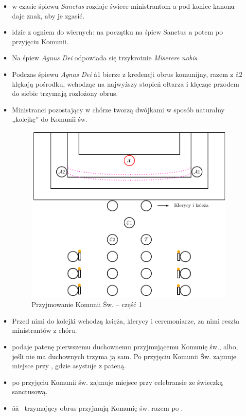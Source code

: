 \begin{itemize}
      \item {} w czasie śpiewu \textit{Sanctus} rozdaje świece ministrantom a
            pod koniec kanonu daje znak, aby je zgasić.
      \item {} idzie z ogniem do wiernych: na początku na śpiew Sanctus a potem
            po przyjęciu Komunii.
      \item Na śpiew \textit{Agnus Dei} odpowiada się trzykrotnie
            \textit{Miserere nobis}.
      \item Podczas śpiewu \textit{Agnus Dei} \aa1 bierze z kredencji obrus
            komunijny, razem z \aa2 klękają pośrodku, wchodząc na najwyższy
            stopień ołtarza i klęcząc przodem do siebie trzymają rozłożony obrus.
      \item Ministranci pozostający w chórze tworzą dwójkami w sposób naturalny
            „kolejkę” do Komunii św.
            \begin{figure}[h!]
                  \centering
                  \includegraphics[width=0.5\linewidth]{Figures/Czwartek/Komunia1.pdf}
                  \caption{Przyjmowanie Komunii Św. -- część 1}
            \end{figure}
      \item Przed nimi do kolejki wchodzą księża, klerycy i ceremoniarze, za nimi
            reszta ministrantów z chóru.
      \item {} podaje patenę pierwszemu duchownemu przyjmującemu Komunię św.,
            albo, jeśli nie ma duchownych trzyma ją sam. Po przyjęciu Komunii Św.
            zajmuje miejsce przy \ii, gdzie asystuje z pateną.
      \item {} po przyjęciu Komunii św. zajmuje miejsce przy celebransie ze
            świeczką sanctusową.
      \item \aa\aa~ trzymający obrus przyjmują Komunię św. razem po \cc.
            \begin{figure}[h!]

\end{figure}
\end{itemize}
